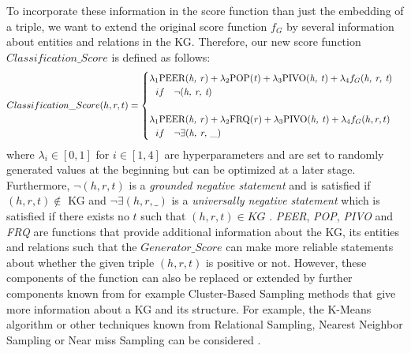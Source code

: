 To incorporate these information in the score function than just the embedding of a triple, we want to extend the original score function $f_G$ by several information about entities and relations in the \ac{KG}.
Therefore, our new score function $Classification\_Score$ is defined as follows:
\begin{equation}
    Classification\_Score(h, r, t)=
    \begin{cases}
         \lambda_1 \text{PEER(\textit{h, r})} + \lambda_2 \text{POP(\textit{t})} + \lambda_3 \text{PIVO(\textit{h, t})} + \lambda_4 f_G(\textit{h, r, t})
         \\ \ \ 
         if\ \ \ \neg(\textit{h, r, t})
         \\ \\
         \lambda_1 \text{PEER(\textit{h, r})} + \lambda_2 \text{FRQ(\textit{r})} + \lambda_3 \text{PIVO(\textit{h, t})} + \lambda_4 f_G(h, r, t)
         \\ \ \ 
         if\ \ \ \neg \exists (\textit{h, r, \_})
         \\
    \end{cases}
\end{equation}
where $\lambda_i \in [0, 1]$ for $i \in [1,4]$ are hyperparameters and are set to randomly generated values at the beginning but can be optimized at a later stage.
Furthermore, $\neg (h, r, t)$ is a \textit{grounded negative statement} and is satisfied if $(h, r, t) \notin$ \ac{KG} and $\neg\exists(h, r, \_)$ is a \textit{universally negative statement} which is satisfied if there exists no $t$ such that $(h, r, t) \in KG$ \cite{arnaout2020enriching}.
\textit{PEER}, \textit{POP}, \textit{PIVO} and \textit{FRQ} are functions that provide additional information about the \ac{KG}, its entities and relations such that the $Generator\_Score$ can make more reliable statements about whether the given triple $(h, r, t)$ is positive or not.
However, these components of the function can also be replaced or extended by further components known from for example Cluster-Based Sampling methods that give more information about a \ac{KG} and its structure.
For example, the K-Means algorithm \cite{qianunderstanding} or other techniques known from Relational Sampling, Nearest Neighbor Sampling or Near miss Sampling can be considered \cite{kotnis2017analysis}.
